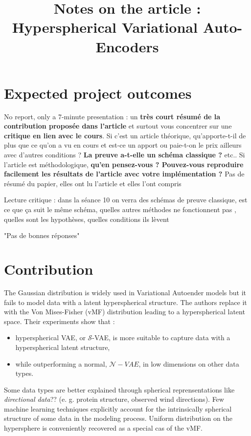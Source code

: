 \documentclass[12pt]{article}
\title{Notes on the article : Hyperspherical Variational Auto-Encoders}
\author{}
\begin{document}
\maketitle

\section{Expected project outcomes}
No report, only a 7-minute presentation :
un \textbf{très court résumé de la contribution proposée dans l'article} et surtout vous concentrer sur une \textbf{critique en lien avec le cours}.
Si c'est un article théorique, qu'apporte-t-il de plus que ce qu'on a vu en cours et est-ce un apport ou paie-t-on le prix ailleurs avec d'autres conditions ? \textbf{La preuve a-t-elle un schéma classique ?} etc..
Si l'article est méthodologique, \textbf{qu'en pensez-vous ? Pouvez-vous reproduire facilement les résultats de l'article avec votre implémentation ?}
Pas de résumé du papier, elles ont lu l'article et elles l'ont compris 
 
Lecture critique : dans la séance 10 on verra des schémas de preuve classique, est ce que ça suit le même schéma, quelles autres méthodes ne fonctionnent pas , quelles sont les hypothèses, quelles conditions ils lèvent 

"Pas de bonnes réponses"

\section{Contribution}
The Gaussian distribution is widely used in Variational Autoender models but it fails to model data with a latent hyperspherical structure. The authors replace it with the Von Mises-Fisher (vMF) distribution leading to a hyperspherical latent space.
Their experiments show that :
\begin{itemize}
    \item hyperspherical VAE, or $\mathcal{S}$-VAE, is more suitable to capture data with a hyperspherical latent structure,
    \item while outperforming a normal, $\mathcal{N}-VAE$, in low dimensions on other data types.
\end{itemize}

Some data types are better explained through spherical reprensentations like \textit{directional data}?? (e. g. protein structure, observed wind directions). Few machine learning techniques explicitly account for the intrinsically spherical structure of some data in the modeling process.
Uniform distribution on the hypersphere is conveniently recovered as a special cas of the vMF.
\end{document}
